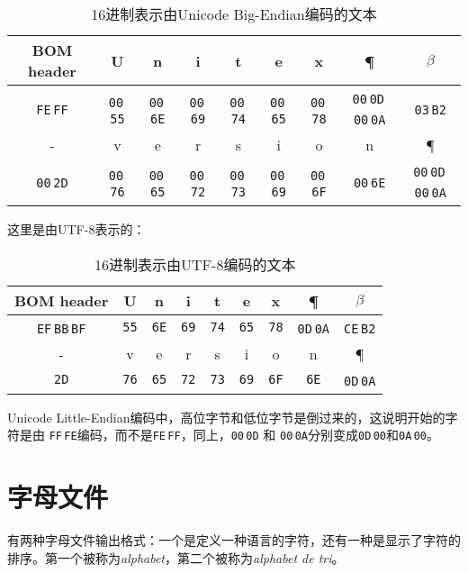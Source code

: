 \bigskip
\begin{table}[!h]
\begin{center}
\begin{tabular}{|c|c|c|c|c|c|c|c|c|}
\hline
BOM header & U & n & i & t & e & x & \P & $\beta$
\\
\hline
\verb+FE+\,\verb+FF+ & \verb+00+\,\verb+55+ & \verb+00+\,\verb+6E+ & \verb+00+\,\verb+69+ & \verb+00+\,\verb+74+ & \verb+00+\,\verb+65+ & \verb+00+\,\verb+78+
& \verb+00+\,\verb+0D+\,\verb+00+\,\verb+0A+ & \verb+03+\,\verb+B2+
\\
\hline
\hline
- & v & e & r & s & i & o & n & \P
\\
\hline
\verb+00+\,\verb+2D+ & \verb+00+\,\verb+76+ & \verb+00+\,\verb+65+ & \verb+00+\,\verb+72+ & \verb+00+\,\verb+73+ & \verb+00+\,\verb+69+ & \verb+00+\,\verb+6F+
& \verb+00+\,\verb+6E+ & \verb+00+\,\verb+0D+\,\verb+00+\,\verb+0A+
\\
\hline
\end{tabular}
\caption{16进制表示由Unicode Big-Endian编码的文本}
\end{center}
\end{table}

\bigskip
\noindent 
这里是由UTF-8表示的：


\bigskip
\begin{table}[!h]
\begin{center}
\begin{tabular}{|c|c|c|c|c|c|c|c|c|}
\hline
BOM header & U & n & i & t & e & x & \P & $\beta$
\\
\hline
\verb+EF+\,\verb+BB+\,\verb+BF+ & \verb+55+ & \verb+6E+ & \verb+69+ & \verb+74+ & \verb+65+ & \verb+78+
& \verb+0D+\,\verb+0A+ & \verb+CE+\,\verb+B2+
\\
\hline
\hline
- & v & e & r & s & i & o & n & \P
\\
\hline
\verb+2D+ & \verb+76+ & \verb+65+ & \verb+72+ & \verb+73+ & \verb+69+ & \verb+6F+
& \verb+6E+ & \verb+0D+\,\verb+0A+
\\
\hline
\end{tabular}
\caption{16进制表示由UTF-8编码的文本}
\end{center}
\end{table}

\bigskip
\noindent
Unicode Little-Endian编码中，高位字节和低位字节是倒过来的，这说明开始的字符是由 \verb+FF+\,\verb+FE+编码，而不是\verb+FE+\,\verb+FF+，同上，\verb+00+\,\verb+0D+ 和 \verb+00+\,\verb+0A+分别变成\verb+0D+\,\verb+00+和\verb+0A+\,\verb+00+。

\section{字母文件}
有两种字母文件输出格式：一个是定义一种语言的字符，还有一种是显示了字符的排序。第一个被称为\textit{alphabet}，第二个被称为\textit{alphabet de tri}。


